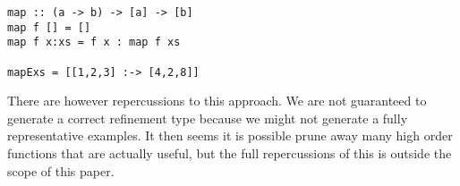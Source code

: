 \begin{lstlisting}
map :: (a -> b) -> [a] -> [b]
map f [] = [] 
map f x:xs = f x : map f xs

mapExs = [[1,2,3] :-> [4,2,8]]
\end{lstlisting}

There are however repercussions to this approach. We are not guaranteed to generate a correct refinement type because we might not generate a fully representative examples. It then seems it is possible prune away many high order functions that are actually useful, but the full repercussions of this is outside the scope of this paper.


